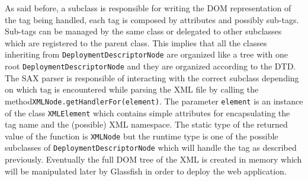As said before, a subclass is responsible for writing the DOM representation of the tag being handled, each tag is composed by attributes and possibly sub-tags. Sub-tags can be managed by the same class or delegated to other subclasses which are registered to the parent class. \newline This implies that all the classes inheriting from \texttt{DeploymentDescriptorNode} are organized like a tree with one root \texttt{DeploymentDescriptorNode} and they are organized according to the DTD. \newline The SAX parser is responsible of interacting with the correct subclass depending on which tag is encountered while parsing the XML file by calling the method\newline\texttt{XMLNode.getHandlerFor(element)}. The parameter \texttt{element} is an instance of the class \texttt{XMLElement} which contains simple attributes for encapsulating the tag name and the (possible) XML namespace. The static type of the returned value of the function is \texttt{XMLNode} but the runtime type is one of the possible subclasses of \newline \texttt{DeploymentDescriptorNode} which will handle the tag as described previously. \newline
Eventually the full DOM tree of the XML is created in memory which will be manipulated later by Glassfish in order to deploy the web application.